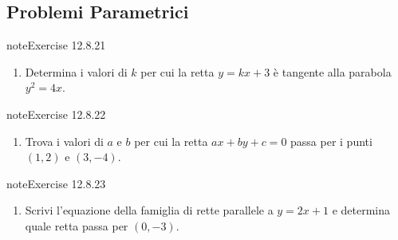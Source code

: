 \documentclass[letterpaper,10pt,italian]{jupyterBook}
\begin{document}
\subsection{Problemi Parametrici}
\label{\detokenize{ch/analytic_geometry/analytic_geometry_2d/sol:problemi-parametrici}} \label{exercise:ch/analytic_geometry/analytic_geometry_2d/sol-exercise-20}

\begin{sphinxadmonition}{note}{Exercise 12.8.21}


\begin{enumerate}
%
\setcounter{enumi}{20}
\item {} 
\sphinxAtStartPar
Determina i valori di \( k \) per cui la retta \( y = kx + 3 \) è tangente alla parabola \( y^2 = 4x \).

\end{enumerate}
\end{sphinxadmonition}
 \label{exercise:ch/analytic_geometry/analytic_geometry_2d/sol-exercise-21}

\begin{sphinxadmonition}{note}{Exercise 12.8.22}


\begin{enumerate}
%
\setcounter{enumi}{21}
\item {} 
\sphinxAtStartPar
Trova i valori di \( a \) e \( b \) per cui la retta \( ax + by + c = 0 \) passa per i punti \( (1, 2) \) e \( (3, -4) \).

\end{enumerate}
\end{sphinxadmonition}
 \label{exercise:ch/analytic_geometry/analytic_geometry_2d/sol-exercise-22}

\begin{sphinxadmonition}{note}{Exercise 12.8.23}


\begin{enumerate}
%
\setcounter{enumi}{22}
\item {} 
\sphinxAtStartPar
Scrivi l’equazione della famiglia di rette parallele a \( y = 2x + 1 \) e determina quale retta passa per \( (0, -3) \).

\end{enumerate}
\end{sphinxadmonition}
 \label{exercise:ch/analytic_geometry/analytic_geometry_2d/sol-exercise-23}
\end{document}
